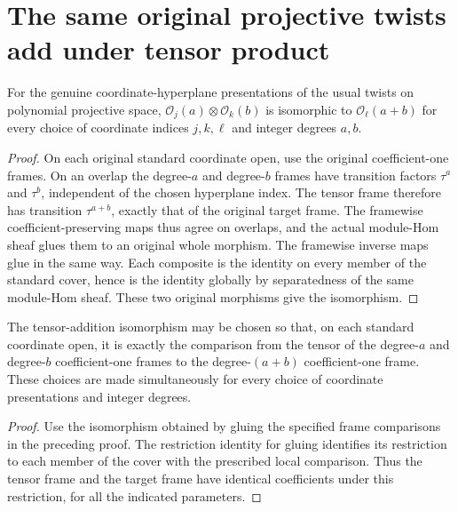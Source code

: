 \section{The same original projective twists add under tensor product}

\begin{lemma}
\label{lem:coherent-projective-original-twist-addition}
\leanok
For the genuine coordinate-hyperplane presentations of the usual twists
on polynomial projective space, $\mathcal O_j(a)\otimes\mathcal O_k(b)$
is isomorphic to $\mathcal O_\ell(a+b)$ for every choice of coordinate
indices $j,k,\ell$ and integer degrees $a,b$.
\end{lemma}
\begin{proof}
On each original standard coordinate open, use the original coefficient-one
frames. On an overlap the degree-$a$ and degree-$b$ frames have transition
factors $\tau^a$ and $\tau^b$, independent of the chosen hyperplane index.
The tensor frame therefore has transition $\tau^{a+b}$, exactly that of
the original target frame. The framewise coefficient-preserving maps
thus agree on overlaps, and the actual module-Hom sheaf glues them to
an original whole morphism. The framewise inverse maps glue in the same
way. Each composite is the identity on every member of the standard
cover, hence is the identity globally by separatedness of the same
module-Hom sheaf. These two original morphisms give the isomorphism.
\end{proof}

\begin{lemma}
\label{lem:projective-twist-tensor-addition-frame}
\leanok
The tensor-addition isomorphism may be chosen so that, on each standard
coordinate open, it is exactly the comparison from the tensor of the
degree-$a$ and degree-$b$ coefficient-one frames to the degree-$(a+b)$
coefficient-one frame. These choices are made simultaneously for every
choice of coordinate presentations and integer degrees.
\end{lemma}
\begin{proof}
Use the isomorphism obtained by gluing the specified frame comparisons
in the preceding proof. The restriction identity for gluing identifies
its restriction to each member of the cover with the prescribed local
comparison. Thus the tensor frame and the target frame have identical
coefficients under this restriction, for all the indicated parameters.
\end{proof}

